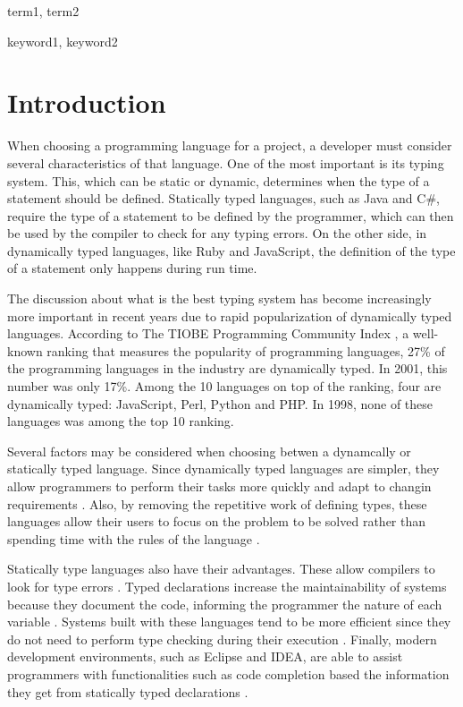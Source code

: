 \documentclass[preprint]{sigplanconf}
\begin{document}

\terms
term1, term2

\keywords
keyword1, keyword2

\section{Introduction}
When choosing a programming language for a project, a developer must consider several characteristics of that language.
One of the most important is its typing system.
This, which can be static or dynamic, determines when the type of a statement should be defined\cite{types_and_programming_languages}. 
Statically typed languages, such as Java and C\#, require the type of a statement to be defined by the programmer, which can then be used by the compiler to check for any typing errors. 
On the other side, in dynamically typed languages, like Ruby and JavaScript, the definition of the type of a statement only happens during run time.

The discussion about what is the best typing system has become increasingly more important in recent years due to rapid popularization of dynamically typed languages. 
According to The TIOBE Programming Community Index \cite{tiobe}, a well-known ranking that measures the popularity of programming languages, 27\% of the programming languages in the industry are dynamically typed. 
In 2001, this number was only 17\%. 
Among the 10 languages on top of the ranking, four are dynamically typed: JavaScript, Perl, Python and PHP. 
In 1998, none of these languages was among the top 10 ranking.

Several factors may be considered when choosing betwen a dynamcally or statically typed language. 
Since dynamically typed languages are simpler, they allow programmers to perform their tasks more quickly \cite{types_and_programming_languages} and adapt to changin requirements \cite{gradual_typing}.
Also, by removing the repetitive work of defining types, these languages allow their users to focus on the problem to be solved rather than spending time with the rules of the language \cite{dynamically_typed_languages}.

Statically type languages also have their advantages. 
These allow compilers to look for type errors \cite{should_your_specification_language_be_typed}. 
Typed declarations increase the maintainability of systems because they document the code, informing the programmer the nature of each variable \cite{type_systems,mayer2012static}. 
Systems built with these languages tend to be more efficient since they do not need to perform type checking during their execution \cite{bruce2002foundations,jit}. 
Finally, modern development environments, such as Eclipse and IDEA, are able to assist programmers with functionalities such as code completion based the information
they get from statically typed declarations \cite{bruch2009learning}.
\end{document}
